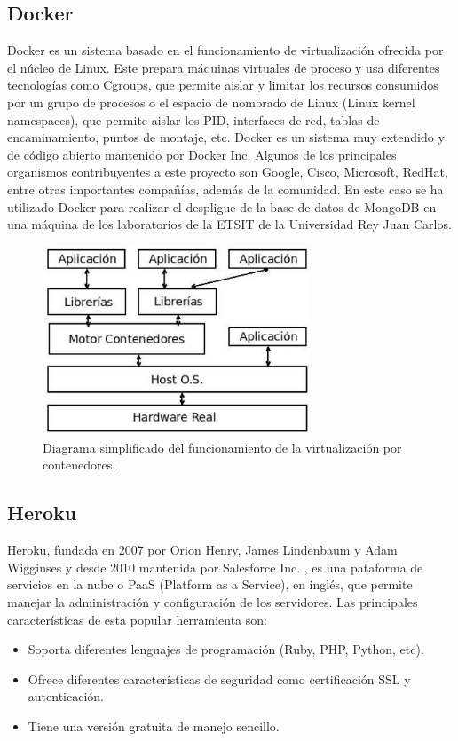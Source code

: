 \documentclass[a4paper, 12pt, oneside]{book}
\begin{document}
\subsection{Docker}
\label{subsec: docker}

Docker es un sistema basado en el funcionamiento de virtualización ofrecida por el núcleo de Linux.
Este prepara máquinas virtuales de proceso y usa diferentes tecnologías como Cgroups, que permite aislar y limitar los recursos consumidos por un grupo de procesos o el espacio de nombrado de Linux (Linux kernel namespaces), que permite aislar los PID, interfaces de red, tablas de encaminamiento, puntos de montaje, etc. Docker es un sistema muy extendido y de código abierto mantenido por Docker Inc. Algunos de los principales organismos contribuyentes a este proyecto son Google, Cisco, Microsoft, RedHat, entre otras importantes compañías, además de la comunidad.
En este caso se ha utilizado Docker para realizar el despligue de la base de datos de MongoDB en una máquina de los laboratorios de la ETSIT de la Universidad Rey Juan Carlos.

\begin{figure}[H]
	\centering
    \includegraphics[width=8cm, keepaspectratio]{img/docker}
    \caption{Diagrama simplificado del funcionamiento de la virtualización por contenedores.}
    \label{figura:esquema_docker}
\end{figure}

\subsection{Heroku}
\label{subsec: heroku}
Heroku, fundada en 2007 por Orion Henry, James Lindenbaum y Adam Wigginses y desde 2010 mantenida por Salesforce Inc. , es una pataforma de servicios en la nube o PaaS (Platform as a Service), en inglés, que permite manejar la administración y configuración de los servidores.
Las principales características de esta popular herramienta son:
\begin{itemize}
	\item Soporta diferentes lenguajes de programación (Ruby, PHP, Python, etc).
	\item Ofrece diferentes características de seguridad como certificación SSL y autenticación.
	\item Tiene una versión gratuita de manejo sencillo.
\end{itemize}
\end{document}
